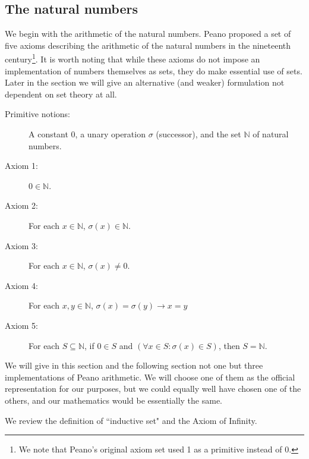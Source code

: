 \documentclass[12pt]{book}
\begin{document}
\subsection{The natural numbers}

We begin with the arithmetic of the natural numbers.  Peano proposed a set of five axioms describing the arithmetic of the natural numbers in the nineteenth century\footnote{We note that Peano's original axiom set used 1 as a primitive instead of 0.}.  It is worth noting that while these axioms do not impose an implementation of numbers themselves as sets, they do make essential use of sets.  Later in the section we will give an alternative (and weaker) formulation not dependent on set theory at all.

\begin{description}

\item[Primitive notions:]  A constant 0, a unary operation $\sigma$ (successor), and the set $\mathbb N$ of natural numbers.

\item[Axiom 1:]  $0 \in \mathbb N$.

\item[Axiom 2:]  For each $x \in {\mathbb N}$, $\sigma(x) \in {\mathbb N}$.

\item[Axiom 3:]  For each $x \in \mathbb N$, $\sigma(x) \neq 0$.

\item[Axiom 4:]  For each $x,y \in \mathbb N$, $\sigma(x)=\sigma(y) \rightarrow x=y$

\item[Axiom 5:]  For each $S \subseteq \mathbb N$, if $0 \in S$ and $(\forall x \in S:\sigma(x) \in S)$, then $S=\mathbb N$.

\end{description}

We will give in this section and the following section not one but three implementations of Peano arithmetic.  We will choose one of them as the official representation for our purposes, but we could equally well have chosen one of the others, and our mathematics would be essentially the same.

We review the definition of ``inductive set" and the Axiom of Infinity.
\end{document}
